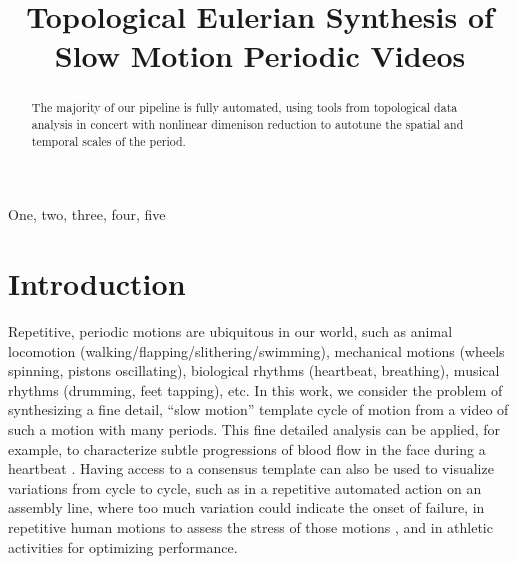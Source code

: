 \documentclass{article}
\title{Topological Eulerian Synthesis of Slow Motion Periodic Videos}
\begin{document}
%
\maketitle
%


\begin{abstract}

The majority of our pipeline is fully automated, using tools from topological data analysis in concert with nonlinear dimenison reduction to autotune the spatial and temporal scales of the period.

\end{abstract}
%
\begin{keywords}
One, two, three, four, five
\end{keywords}
%


\section{Introduction}

Repetitive, periodic motions are ubiquitous in our world, such as animal locomotion (walking/flapping/slithering/swimming), mechanical motions (wheels spinning, pistons oscillating), biological rhythms (heartbeat, breathing), musical rhythms (drumming, feet tapping), etc.  In this work, we consider the problem of synthesizing a fine detail, ``slow motion'' template cycle of motion from a video of such a motion with many periods.  This fine detailed analysis can be applied, for example, to characterize subtle progressions of blood flow in the face during a heartbeat \cite{kumar2015distanceppg}.  Having access to a consensus template can also be used to visualize variations from cycle to cycle, such as in a repetitive automated action on an assembly line, where too much variation could indicate the onset of failure, in repetitive human motions to assess the stress of those motions \cite{greene2017visualizing}, and in athletic activities for optimizing performance.
\end{document}
